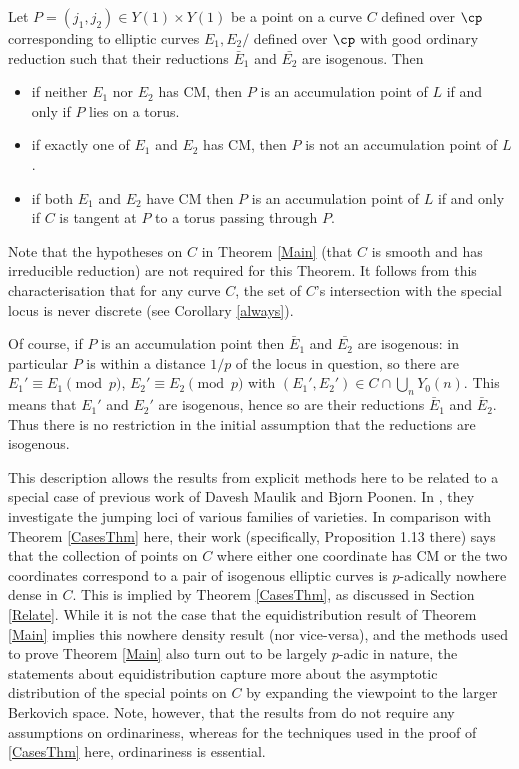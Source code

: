 \documentclass[12pt,letterpaper]{article}
\begin{document}
	\begin{thm}\label{CasesThm}
		Let $P=(j_1,j_2) \in Y(1)\times Y(1)$ be a point on a curve $C$ defined over $\cp$ corresponding to elliptic curves $E_1,E_2/$ defined over $\cp$ with good ordinary reduction such that their reductions $\bar{E}_1$ and $\bar{E_2}$ are isogenous. Then 
	\begin{itemize}
		\item[(a)] if neither $E_1$ nor $E_2$ has CM, then $P$ is an accumulation point of $L$ if and only if $P$ lies on a torus.
		\item[(b)] if exactly one of $E_1$ and $E_2$ has CM, then $P$ is not an accumulation point of $L$.
		\item[(c)] if both $E_1$ and $E_2$ have CM then $P$ is an accumulation point of $L$ if and only if $C$ is tangent at $P$ to a torus passing through $P$.
	\end{itemize}
	\end{thm}
	Note that the hypotheses on $C$ in Theorem \ref{Main} (that $C$ is smooth and has irreducible reduction) are not required for this Theorem. It follows from this characterisation that for any curve $C$, the set of $C$'s intersection with the special locus is never discrete (see Corollary \ref{always}).
	
	Of course, if $P$ is an accumulation point then $\bar{E}_1$ and $\bar{E_2}$ are isogenous: in particular $P$ is within a distance $1/p$ of the locus in question, so there are $E_1'\equiv E_1 \pmod{p}$, $E_2'\equiv E_2\pmod{p}$ with $(E_1',E_2')\in C\cap \bigcup_nY_0(n)$. This means that $E_1'$ and $E_2'$ are isogenous, hence so are their reductions $\bar{E}_1$ and $\bar{E}_2$. Thus there is no restriction in the initial assumption that the reductions are isogenous.
	
	
	This description allows the results from explicit methods here to be related to a special case of previous work of Davesh Maulik and Bjorn Poonen. In \cite{MP09}, they investigate the jumping loci of various families of varieties. In comparison with Theorem \ref{CasesThm} here, their work (specifically, Proposition 1.13 there) says that the collection of points on $C$ where either one coordinate has CM or the two coordinates correspond to a pair of isogenous elliptic curves is $p$-adically nowhere dense in $C$. This is implied by Theorem \ref{CasesThm}, as discussed in Section \ref{Relate}. While it is not the case that the equidistribution result of Theorem \ref{Main} implies this nowhere density result (nor vice-versa), and the methods used to prove Theorem \ref{Main} also turn out to be largely $p$-adic in nature, the statements about equidistribution capture more about the asymptotic distribution of the special points on $C$ by expanding the viewpoint to the larger Berkovich space. Note, however, that the results from \cite{MP09} do not require any assumptions on ordinariness, whereas for the techniques used in the proof of \ref{CasesThm} here, ordinariness is essential.
	
\end{document}
